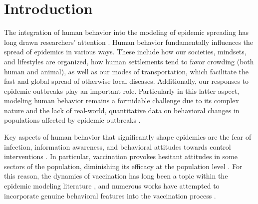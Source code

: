 \documentclass[
 reprint,
 amsmath,amssymb,
 aps,
]{revtex4-2}
\begin{document}

\maketitle

\section{Introduction}
\label{sec:intro}

The integration of human behavior into the modeling of epidemic spreading has long drawn researchers' attention \cite{ferguson2007capturing}. Human behavior fundamentally influences the spread of epidemics in various ways. These include how our societies, mindsets, and lifestyles are organized, how human settlements tend to favor crowding (both human and animal), as well as our modes of transportation, which facilitate the fast and global spread of otherwise local diseases. Additionally, our responses to epidemic outbreaks play an important role. Particularly in this latter aspect, modeling human behavior remains a formidable challenge due to its complex nature and the lack of real-world, quantitative data on behavioral changes in populations affected by epidemic outbreaks \cite{funk2010modelling, perra2011towards}.

Key aspects of human behavior that significantly shape epidemics are the fear of infection, information awareness, and behavioral attitudes towards control interventions \cite{vardavas2007can, epstein2008coupled, salathe2008effect, perra2011towards, mao2012coupling, rizzo2014effect}. In particular, vaccination provokes hesitant attitudes in some sectors of the population, diminishing its efficacy at the population level \cite{dube2013vaccine, troiano2021vaccine}. For this reason, the dynamics of vaccination has long been a topic within the epidemic modeling literature \cite{bernoulli1760essai, hethcote1978immunization, liu2008svir, hsieh2010age, wang2016statistical}, and numerous works have attempted to incorporate genuine behavioral features into the vaccination process \cite{vardavas2007can, mao2012coupling, wang2015coupled, wang2016statistical, yin2022impact}.
 
\end{document}
